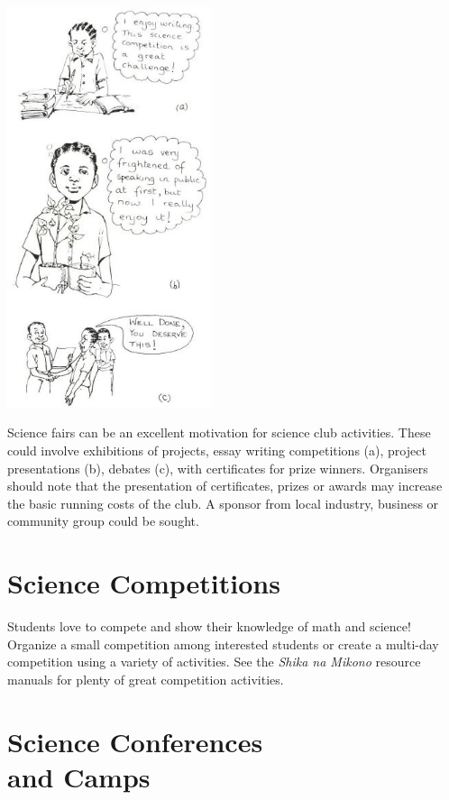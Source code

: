 \begin{multicols}{2}
\begin{center}
\includegraphics[width=0.45\textwidth]{./img/source/science-fairs.jpg}
\end{center}

Science fairs can be an excellent motivation
for science club activities. These could involve
exhibitions of projects, essay writing
competitions (a), project presentations (b),
debates (c), with certificates for prize winners.
Organisers should note that the presentation of
certificates, prizes or awards may increase the
basic running costs of the club. A sponsor from
local industry, business or community group
could be sought.

\section{Science Competitions}

Students love to compete and show their knowledge of math and science! Organize a small competition among interested students or create a multi-day competition using a variety of activities. See the \emph{Shika na Mikono} resource manuals for plenty of great competition activities.


\section{Science Conferences \hfill \\ and Camps}


\end{multicols}
